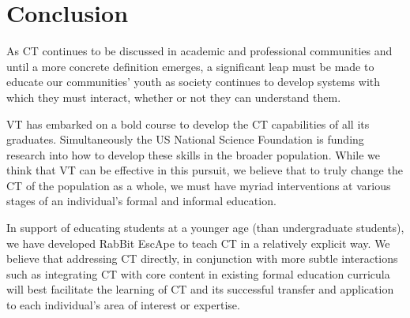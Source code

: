 \documentclass{acm_proc_article-sp}
\begin{document}
\section{Conclusion}
\label{sec:conclusion}
\sloppy As CT continues to be discussed in academic and professional communities and until a more concrete definition emerges, a significant leap must be made to educate our communities' youth as society continues to develop systems with which they must interact, whether or not they can understand them. 

VT has embarked on a bold course to develop the CT capabilities of all its graduates.
Simultaneously the US National Science Foundation is funding research into how to develop these skills in the broader population.
While we think that VT can be effective in this pursuit, we believe that to truly change the CT of the population as a whole, we must have myriad interventions at various stages of an individual's formal and informal education.

In support of educating students at a younger age (than undergraduate students), we have developed RabBit EscApe to teach CT in a relatively explicit way.
We believe that addressing CT directly, in conjunction with more subtle interactions such as integrating CT with core content in existing formal education curricula\cite{NSFCE21} will best facilitate the learning of CT and its successful transfer and application to each individual's area of interest or expertise.
\end{document}
